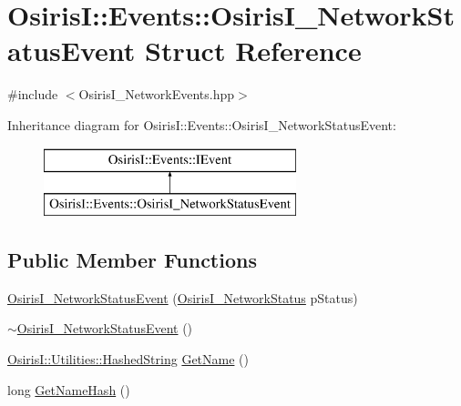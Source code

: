\hypertarget{struct_osiris_i_1_1_events_1_1_osiris_i___network_status_event}{\section{Osiris\-I\-:\-:Events\-:\-:Osiris\-I\-\_\-\-Network\-Status\-Event Struct Reference}
\label{struct_osiris_i_1_1_events_1_1_osiris_i___network_status_event}
}


{\ttfamily \#include $<$Osiris\-I\-\_\-\-Network\-Events.\-hpp$>$}

Inheritance diagram for Osiris\-I\-:\-:Events\-:\-:Osiris\-I\-\_\-\-Network\-Status\-Event\-:\begin{figure}[H]
\begin{center}
\leavevmode
\includegraphics[height=2.000000cm]{struct_osiris_i_1_1_events_1_1_osiris_i___network_status_event}
\end{center}
\end{figure}
\subsection*{Public Member Functions}
\begin{DoxyCompactItemize}
\item 
\hyperlink{struct_osiris_i_1_1_events_1_1_osiris_i___network_status_event_a0c9474bd9732b7b240e10f0e3b847441}{Osiris\-I\-\_\-\-Network\-Status\-Event} (\hyperlink{namespace_osiris_i_1_1_events_ab333d7f608a8f84b9c3fa0c1f7517e78}{Osiris\-I\-\_\-\-Network\-Status} p\-Status)
\item 
\hyperlink{struct_osiris_i_1_1_events_1_1_osiris_i___network_status_event_a2622cc8cfbd8f6388c73d7ecc8dbf40f}{$\sim$\-Osiris\-I\-\_\-\-Network\-Status\-Event} ()
\item 
\hyperlink{class_osiris_i_1_1_utilities_1_1_hashed_string}{Osiris\-I\-::\-Utilities\-::\-Hashed\-String} \hyperlink{struct_osiris_i_1_1_events_1_1_osiris_i___network_status_event_a01316e6560b9495dfc3d0579385b3f3c}{Get\-Name} ()
\item 
long \hyperlink{struct_osiris_i_1_1_events_1_1_osiris_i___network_status_event_aa07fec6e959f0b16ce2e1e4a541b1bc5}{Get\-Name\-Hash} ()
\end{DoxyCompactItemize}
